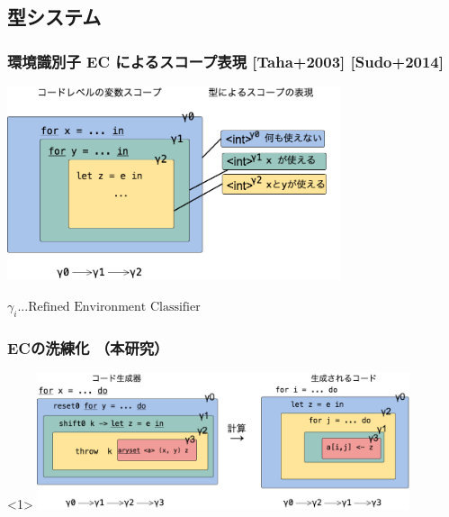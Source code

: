 \subsection{型システム}

\begin{frame}
  \frametitle{環境識別子 EC によるスコープ表現 [Taha+2003] [Sudo+2014]}
  \begin{center}
    \includegraphics[clip,height=5.7cm]{./img/ec_for.png}
  \end{center}
  \begin{flushright}
    $\gamma_i ... \text{Refined Environment Classifier}$
  \end{flushright}
\end{frame}

\begin{frame}
  \frametitle{ECの洗練化 （本研究）}
  \begin{onlyenv}<1>
    \flushleft
    \includegraphics[clip,height=4cm]{./img/ecex.png}
  \end{onlyenv}
\end{frame}

